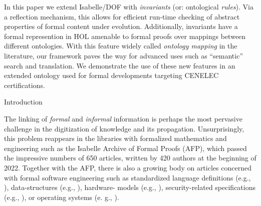 \begin{isabellebody}
\begin{isamarkuptext*}
   In this paper we extend  Isabelle/DOF with \emph{invariants} (or: ontological \emph{rules}). Via a reflection 
   mechanism, this allows for efficient run-time checking of abstract properties of formal
   content under evolution. Additionally, invariants have a formal represention in HOL amenable to
   formal proofs over mappings between different ontologies.  
   With this feature widely called \emph{ontology mapping} in the literature, our framework paves the 
   way for advanced uses such as ``semantic'' search and translation. We demonstrate the use of 
   these new features in an extended  ontology used for formal developments targeting CENELEC 
   certifications.
    \vspace{-0.3cm}
\end{isamarkuptext*}\isamarkuptrue%

\begin{isamarkupsection*}
[label = {introheader},type = {scholarly_paper.introduction}, args={label = {introheader},type = {scholarly_paper.introduction}, Isa_COL.text_element.level = {}, Isa_COL.text_element.referentiable = {False}, Isa_COL.text_element.variants = {{STR ''outline'', STR ''document''}}, scholarly_paper.text_section.main_author = {}, scholarly_paper.text_section.fixme_list = {}, Isa_COL.text_element.level = {}}]Introduction
\end{isamarkupsection*}\isamarkuptrue%

\begin{isamarkuptext*}
[label = {introtext},type = {scholarly_paper.introduction}, args={label = {introtext},type = {scholarly_paper.introduction}, Isa_COL.text_element.level = {}, Isa_COL.text_element.referentiable = {False}, Isa_COL.text_element.variants = {{STR ''outline'', STR ''document''}}, scholarly_paper.text_section.main_author = {}, scholarly_paper.text_section.fixme_list = {}, Isa_COL.text_element.level = {}}]\vspace{-0.2cm}
The linking of \emph{formal} and \emph{informal} information is perhaps the most pervasive challenge 
in the digitization of knowledge and its propagation. Unsurprisingly, this problem reappears 
in the libraries with formalized mathematics and engineering such as the Isabelle Archive of 
Formal Proofs \cite{AFP-ref22} (AFP), which passed the impressive numbers of 650 articles, 
written by 420 authors at the beginning of 2022. Together with the AFP, there is also a growing 
body on articles concerned with formal software engineering such as standardized language 
definitions (e.g., \cite{CakeML-AFP,brucker.ea:featherweight:2014}), 
data-structures 
(e.g., \cite{brucker.ea:afp-core-dom:2018,Splay_Tree-AFP}), hardware- models 
(e.g., \cite{SPARCv8-AFP}), 
security-related specifications 
(e.g., \cite{brucker.ea:upf-firewall:2017,Security_Protocol_Refinement-AFP}), 
or operating systems (e. g., \cite{verbeek.ea:formal:2014,klein.ea:comprehensive:2014}).



\end{isamarkuptext*}
\end{isabellebody}
